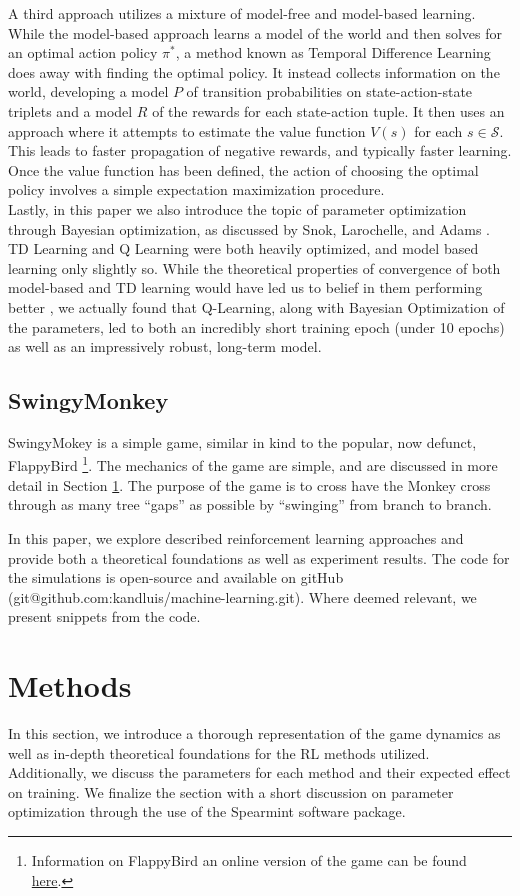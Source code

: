 \documentclass[letterpaper]{article}
\begin{document}
A third approach utilizes a mixture of model-free and model-based learning. While the model-based approach learns a model of the world and then solves for an optimal action policy $\pi^*$, a method known as Temporal Difference Learning does away with finding the optimal policy. It instead collects information on the world, developing a model $P$ of transition probabilities on state-action-state triplets and a model $R$ of the rewards for each state-action tuple. It then uses an approach where it attempts to estimate the value function $V(s)$ for each $s \in \mathcal{S}$. This leads to faster propagation of negative rewards, and typically faster learning. Once the value function has been defined, the action of choosing the optimal policy involves a simple expectation maximization procedure.
\\
Lastly, in this paper we also introduce the topic of parameter optimization through Bayesian optimization, as discussed by Snok, Larochelle, and Adams \cite{bayes}. TD Learning and Q Learning were both heavily optimized, and model based learning only slightly so. While the theoretical properties of convergence of both model-based and TD learning would have led us to belief in them performing better , we actually found that Q-Learning, along with Bayesian Optimization of the parameters, led to both an incredibly short training epoch (under 10 epochs) as well as an impressively robust, long-term model.

\subsection{SwingyMonkey}
SwingyMokey is a simple game, similar in kind to the popular, now defunct, FlappyBird \footnote{Information on FlappyBird an online version of the game can be found \href{http://flappybird.io/}{here}.}. The mechanics of the game are simple, and are discussed in more detail in Section \ref{sec:methods}. The purpose of the game is to cross have the Monkey cross through as many tree ``gaps'' as possible by ``swinging'' from branch to branch.

In this paper, we explore described reinforcement learning approaches and provide both a theoretical foundations as well as experiment results. The code for the simulations is open-source and available on gitHub (git@github.com:kandluis/machine-learning.git). Where deemed relevant, we present snippets from the code.

\section{Methods}
\label{sec:methods}
In this section, we introduce a thorough representation of the game dynamics as well as in-depth theoretical foundations for the RL methods utilized. Additionally, we discuss the parameters for each method and their expected effect on training. We finalize the section with a short discussion on parameter optimization through the use of the Spearmint software package.
\end{document}
